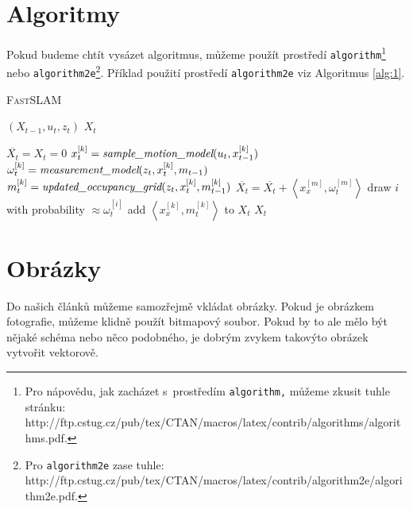 \documentclass[11pt,a4paper]{article}
\begin{document}
\section{Algoritmy}\label{sec:3}
Pokud budeme chtít vysázet algoritmus, můžeme použít prostředí
\verb|algorithm|\footnote{Pro nápovědu, jak zacházet s~prostředím 
\texttt{algorithm,} můžeme zkusit tuhle stránku: \\
http://ftp.cstug.cz/pub/tex/CTAN/macros/latex/contrib/algorithms/algorithms.pdf.}
nebo \verb|algorithm2e|\footnote{Pro \texttt{algorithm2e} zase tuhle:
http://ftp.cstug.cz/pub/tex/CTAN/macros/latex/contrib/algorithm2e/algorithm2e.pdf.}.
Příklad použití prostředí \verb|algorithm2e| viz Algoritmus \ref{alg:1}.

\begin{algorithm}[!]
	\label{alg:1}
	\caption{\textsc{Fast}SLAM}

	\begin{algorithmic}[1]
		\REQUIRE $(X_{t-1},u_{t},z_{t})$
		\ENSURE $X_{t}$

		\STATE $\overline{X_{t}} = X_{t} = 0$
			\STATE $x_{t}^{[k]} = \emph{sample\_motion\_model}(u_{t},x_{t-1}^{[k]})$
			\STATE $\omega_{t}^{[k]} = \emph{measurement\_model}(z_{t},x_{t}^{[k]}, m_{t-1})$
			\STATE $m_{t}^{[k]} = \emph{updated\_occupancy\_grid}(z_{t}, x_{t}^{[k]}, m_{t-1}^{[k]})$
			\STATE $\overline{X_{t}} = \overline{X_{t}} +\left \langle x_{x}^{[m]}, \omega_{t}^{[m]} \right \rangle $
		\ENDFOR
			\STATE draw $i$ with probability $\approx \omega_{t}^{[i]}$
			\STATE add $\left \langle x_{x}^{[k]}, m_{t}^{[k]} \right \rangle $ to $X_{t}$
		\ENDFOR
		\RETURN $X_{t}$
	\end{algorithmic}
\end{algorithm}


\section{Obrázky}
Do našich článků můžeme samozřejmě vkládat obrázky. Pokud je obrázkem
fotografie, můžeme klidně použít bitmapový soubor. Pokud by to ale mělo být
nějaké schéma nebo něco podobného, je dobrým zvykem takovýto obrázek vytvořit
vektorově.
\end{document}
